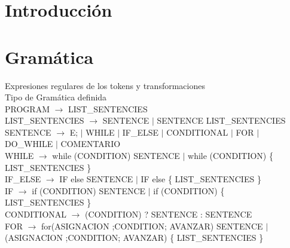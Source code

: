 \documentclass[10pt,a4paper]{article}
\begin{document}

\fecha{\today}



\maketitle

\tableofcontents

\newpage
\section{Introducción}

\section{Gramática}
Expresiones regulares de los tokens y transformaciones\\
Tipo de Gramática definida \\


PROGRAM $\rightarrow$ LIST\_SENTENCIES \\

LIST\_SENTENCIES $\rightarrow$ SENTENCE $|$ SENTENCE LIST\_SENTENCIES\\

SENTENCE $\rightarrow$ E; $|$ WHILE $|$ IF\_ELSE $|$ CONDITIONAL $|$ FOR $|$ DO\_WHILE $|$ COMENTARIO \\

WHILE $\rightarrow$ while (CONDITION) SENTENCE $|$ while (CONDITION) \{ LIST\_SENTENCIES \} \\

IF\_ELSE $\rightarrow$ IF else SENTENCE $|$ IF else \{ LIST\_SENTENCIES \} \\

IF $\rightarrow$ if (CONDITION) SENTENCE $|$ if (CONDITION) \{ LIST\_SENTENCIES \} \\

CONDITIONAL $\rightarrow$ (CONDITION) ? SENTENCE : SENTENCE \\

FOR $\rightarrow$ for(ASIGNACION ;CONDITION; AVANZAR) SENTENCE $|$ (ASIGNACION ;CONDITION; AVANZAR) \{ LIST\_SENTENCIES \} \\
\end{document}
